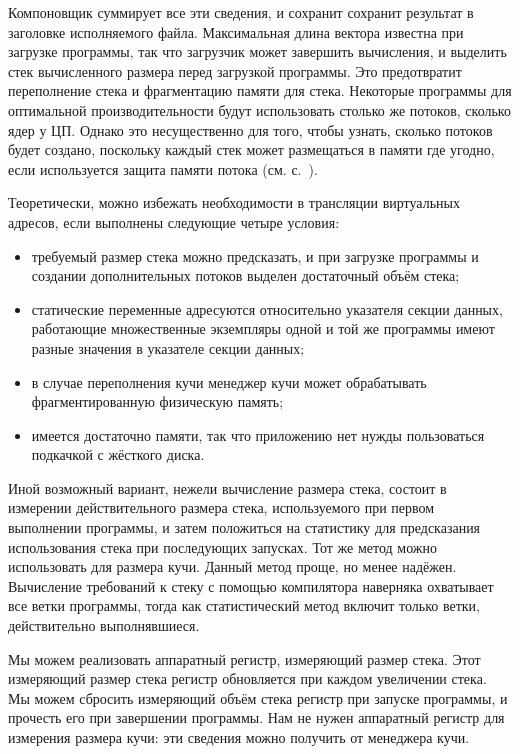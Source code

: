 \documentclass[forwardcom.tex]{subfiles}
\begin{document}
Компоновщик суммирует все эти сведения, и сохранит сохранит результат в заголовке исполняемого файла. Максимальная длина вектора известна при загрузке программы, так что загрузчик может завершить вычисления, и выделить стек вычисленного размера перед загрузкой программы. Это предотвратит переполнение стека и фрагментацию памяти для стека. Некоторые программы для оптимальной производительности будут использовать столько же потоков, сколько ядер у ЦП. Однако это несущественно для того, чтобы узнать, сколько потоков будет создано, поскольку каждый стек может размещаться в памяти где угодно, если используется защита памяти потока (см. с.~\pageref{threadMemoryProtection}). 

Теоретически, можно избежать необходимости в трансляции виртуальных адресов, если выполнены следующие четыре условия: 
\begin{itemize}
\item требуемый размер стека можно предсказать, и при загрузке программы и создании дополнительных потоков выделен достаточный объём стека;

\item статические переменные адресуются относительно указателя секции данных, работающие множественные экземпляры одной и той же программы имеют разные значения в указателе секции данных;

\item в случае переполнения кучи менеджер кучи может обрабатывать фрагментированную физическую память;

\item имеется достаточно памяти, так что приложению нет нужды пользоваться подкачкой с жёсткого диска.
\end{itemize}

Иной возможный вариант, нежели вычисление размера стека, состоит в измерении действительного размера стека, используемого при первом выполнении программы, и затем положиться на статистику для предсказания использования стека при последующих запусках. Тот же метод можно использовать для размера кучи. Данный метод проще, но менее надёжен. Вычисление требований к стеку с помощью компилятора наверняка охватывает все ветки программы, тогда как статистический метод включит только ветки, действительно выполнявшиеся.

Мы можем реализовать аппаратный регистр, измеряющий размер стека. Этот измеряющий размер стека регистр обновляется при каждом увеличении стека. Мы можем сбросить измеряющий объём стека регистр при запуске программы, и прочесть его при завершении программы. Нам не нужен аппаратный регистр для измерения размера кучи: эти сведения можно получить от менеджера кучи.
\end{document}
